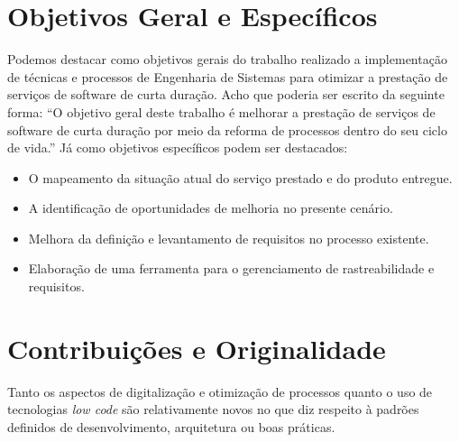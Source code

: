 	\section{Objetivos Geral e Específicos}\label{sec:introducao:objetivos}

		Podemos destacar como objetivos gerais do trabalho realizado a implementação de 
		técnicas e processos de Engenharia de Sistemas para otimizar a prestação de 
		serviços de software de curta duração. {\color{red} Acho que poderia ser escrito da seguinte forma: ``O objetivo geral deste trabalho é melhorar a prestação de serviços de software de curta duração por meio da reforma de processos dentro do seu ciclo de vida.''}
		Já como objetivos específicos podem ser destacados: 
		\begin{itemize}
			\item O mapeamento da situação atual do serviço prestado e do produto entregue.
			\item A identificação de oportunidades de melhoria no presente cenário. 
			\item Melhora da definição e levantamento de requisitos no processo existente.
			\item Elaboração de uma ferramenta para o gerenciamento de rastreabilidade e requisitos.
		\end{itemize}
 		
	\section{Contribuições e Originalidade}\label{sec:introducao:contribuicoes}

		Tanto os aspectos de digitalização e otimização de processos quanto o uso de tecnologias \textit{low code} são relativamente novos no que diz respeito à padrões definidos
		de desenvolvimento, arquitetura ou boas práticas.

